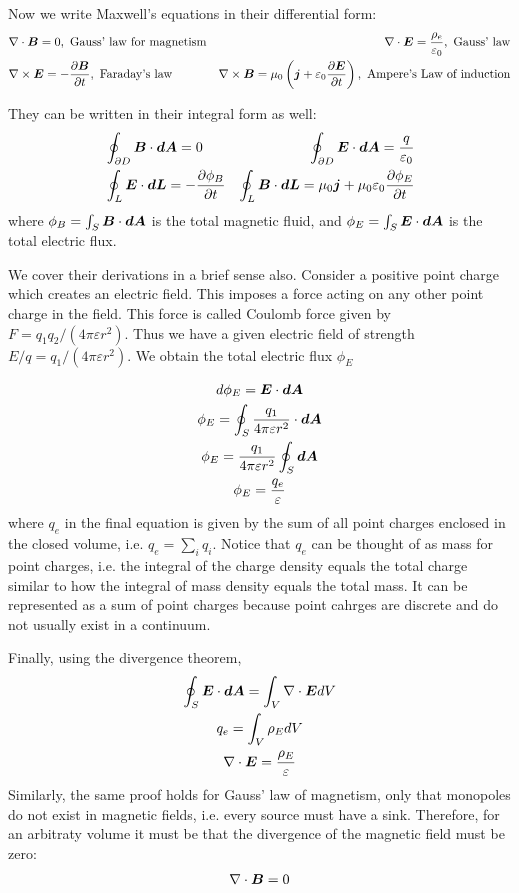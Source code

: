 \documentclass{article}
\begin{document}
Now we write Maxwell's equations in their differential form:
\begin{align*}
    &\nabla\cdot\boldsymbol{B} = 0, \text{ Gauss' law for magnetism}
    & \nabla \cdot \boldsymbol{E} = \frac{\rho_e}{\varepsilon_0}, \text{ Gauss' law}\\
    &\nabla \times \boldsymbol{E} = -\frac{\partial \boldsymbol{B}}{\partial t}, \text{ Faraday's law}
    &\nabla \times \boldsymbol{B} = \mu_0\left(\boldsymbol{j} + \varepsilon_0\frac{\partial \boldsymbol{E}}{\partial t}\right),
    \text{ Ampere's Law of induction}
\end{align*}

They can be written in their integral form as well: 
\begin{align*}
    &\oint_{\partial D} \boldsymbol{B}\cdot\boldsymbol{dA} = 0 
    & \oint_{\partial D} \boldsymbol{E}\cdot\boldsymbol{dA} = \frac{q}{\varepsilon_0}\\
    &\oint_L \boldsymbol{E}\cdot\boldsymbol{dL} = -\frac{\partial \phi_{B}}{\partial t} 
    & \oint_L\boldsymbol{B}\cdot\boldsymbol{dL} = \mu_0\boldsymbol{j} + \mu_0\varepsilon_0\frac{\partial \phi_E}{\partial t}
\end{align*}
where $\phi_B = \int_S \boldsymbol{B}\cdot\boldsymbol{dA}$ is the total magnetic fluid, and 
$\phi_E = \int_S \boldsymbol{E}\cdot\boldsymbol{dA}$ is the total electric flux. 


We cover their derivations in a brief sense also. Consider a positive point
charge which creates an electric field. This imposes a force acting on any other
point charge in the field. This force is called Coulomb force given by $F =
q_1q_2/(4\pi\varepsilon r^2)$. Thus we have a given electric field of strength
$E/q = q_1/(4\pi\varepsilon r^2)$. We obtain the total electric flux $\phi_E$ 

\begin{gather*}
    d\phi_E = \boldsymbol{E}\cdot\boldsymbol{dA}\\
    \phi_E = \oint_S\frac{q_1}{4\pi\varepsilon r^2}\cdot\boldsymbol{dA}\\
    \phi_E = \frac{q_1}{4\pi\varepsilon r^2}\oint_S\boldsymbol{dA}\\
    \phi_E = \frac{q_e}{\varepsilon}
\end{gather*} 
where $q_e$ in the final equation is given by the sum of all point charges
enclosed in the closed volume, i.e. $q_e = \sum_i q_i$. Notice that $q_e$ can be
thought of as mass for point charges, i.e. the integral of the charge density
equals the total charge similar to how the integral of mass density equals the
total mass. It can be represented as a sum of point charges because point
cahrges are discrete and do not usually exist in a continuum. 

Finally, using the divergence theorem, 
\begin{gather*}
    \oint_S \boldsymbol{E}\cdot\boldsymbol{dA} = \int_V \nabla\cdot\boldsymbol{E} dV\\
    q_e = \int_V \rho_{E} dV\\
    \nabla\cdot\boldsymbol{E} = \frac{\rho_E}{\varepsilon}
\end{gather*}
Similarly, the same proof holds for Gauss' law of magnetism, only that monopoles
do not exist in magnetic fields, i.e. every source must have a sink. Therefore,
for an arbitraty volume it must be that the divergence of the magnetic field
must be zero: 
\begin{gather*}
    \nabla \cdot\boldsymbol{B} = 0
\end{gather*}
\end{document}
